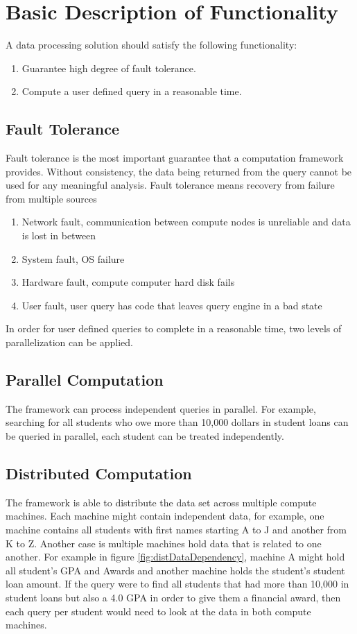 \documentclass[10pt,twocolumn]{IEEEtran11}
\begin{document}
\section{Basic Description of Functionality}

A data processing solution should satisfy the following functionality:
\begin{enumerate}	
	\item Guarantee high degree of fault tolerance.
	\item Compute a user defined query in a reasonable time.
\end{enumerate}

\subsection{Fault Tolerance}
Fault tolerance is the most important guarantee that a computation framework provides.  Without consistency, the data being returned from the query cannot be used for any meaningful analysis. Fault tolerance means recovery from failure from multiple sources

\begin{enumerate}
	\item Network fault, communication between compute nodes is unreliable and data is lost in between
	\item System fault, OS failure
	\item Hardware fault, compute computer hard disk fails
	\item User fault, user query has code that leaves query engine in a bad state
\end{enumerate}

In order for user defined queries to complete in a reasonable time, two levels of parallelization can be applied.

\subsection{Parallel Computation}
The framework can process independent queries in parallel.  For example, searching for all students who owe more than 10,000 dollars in student loans
can be queried in parallel, each student can be treated independently.

\subsection{Distributed Computation}
The framework is able to distribute the data set across multiple compute machines.  Each machine might contain independent data, for example, one machine contains all students with first names starting A to J and another from K to Z.  Another case is multiple machines hold data that is related to one another.  For example in figure \ref{fig:distDataDependency}, machine A might hold all student's GPA and Awards and another machine holds the student's student loan amount.
If the query were to find all students that had more than 10,000 in student loans but also a 4.0 GPA in order to give them a financial award, then each query per student would need to look at the data in both compute machines.
\end{document}
